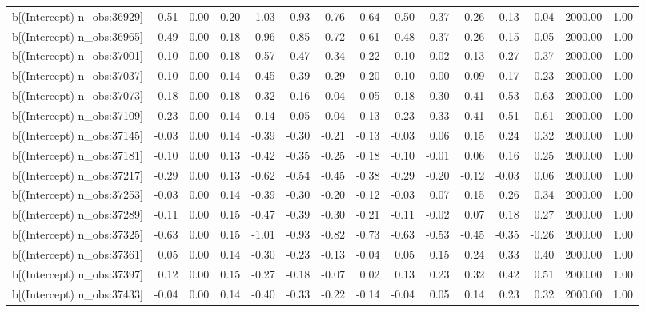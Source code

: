 \begin{table}[ht]
\begin{tabular}{rrrrrrrrrrrrrrr}
  b[(Intercept) n\_obs:36929] & -0.51 & 0.00 & 0.20 & -1.03 & -0.93 & -0.76 & -0.64 & -0.50 & -0.37 & -0.26 & -0.13 & -0.04 & 2000.00 & 1.00 \\ 
  b[(Intercept) n\_obs:36965] & -0.49 & 0.00 & 0.18 & -0.96 & -0.85 & -0.72 & -0.61 & -0.48 & -0.37 & -0.26 & -0.15 & -0.05 & 2000.00 & 1.00 \\ 
  b[(Intercept) n\_obs:37001] & -0.10 & 0.00 & 0.18 & -0.57 & -0.47 & -0.34 & -0.22 & -0.10 & 0.02 & 0.13 & 0.27 & 0.37 & 2000.00 & 1.00 \\ 
  b[(Intercept) n\_obs:37037] & -0.10 & 0.00 & 0.14 & -0.45 & -0.39 & -0.29 & -0.20 & -0.10 & -0.00 & 0.09 & 0.17 & 0.23 & 2000.00 & 1.00 \\ 
  b[(Intercept) n\_obs:37073] & 0.18 & 0.00 & 0.18 & -0.32 & -0.16 & -0.04 & 0.05 & 0.18 & 0.30 & 0.41 & 0.53 & 0.63 & 2000.00 & 1.00 \\ 
  b[(Intercept) n\_obs:37109] & 0.23 & 0.00 & 0.14 & -0.14 & -0.05 & 0.04 & 0.13 & 0.23 & 0.33 & 0.41 & 0.51 & 0.61 & 2000.00 & 1.00 \\ 
  b[(Intercept) n\_obs:37145] & -0.03 & 0.00 & 0.14 & -0.39 & -0.30 & -0.21 & -0.13 & -0.03 & 0.06 & 0.15 & 0.24 & 0.32 & 2000.00 & 1.00 \\ 
  b[(Intercept) n\_obs:37181] & -0.10 & 0.00 & 0.13 & -0.42 & -0.35 & -0.25 & -0.18 & -0.10 & -0.01 & 0.06 & 0.16 & 0.25 & 2000.00 & 1.00 \\ 
  b[(Intercept) n\_obs:37217] & -0.29 & 0.00 & 0.13 & -0.62 & -0.54 & -0.45 & -0.38 & -0.29 & -0.20 & -0.12 & -0.03 & 0.06 & 2000.00 & 1.00 \\ 
  b[(Intercept) n\_obs:37253] & -0.03 & 0.00 & 0.14 & -0.39 & -0.30 & -0.20 & -0.12 & -0.03 & 0.07 & 0.15 & 0.26 & 0.34 & 2000.00 & 1.00 \\ 
  b[(Intercept) n\_obs:37289] & -0.11 & 0.00 & 0.15 & -0.47 & -0.39 & -0.30 & -0.21 & -0.11 & -0.02 & 0.07 & 0.18 & 0.27 & 2000.00 & 1.00 \\ 
  b[(Intercept) n\_obs:37325] & -0.63 & 0.00 & 0.15 & -1.01 & -0.93 & -0.82 & -0.73 & -0.63 & -0.53 & -0.45 & -0.35 & -0.26 & 2000.00 & 1.00 \\ 
  b[(Intercept) n\_obs:37361] & 0.05 & 0.00 & 0.14 & -0.30 & -0.23 & -0.13 & -0.04 & 0.05 & 0.15 & 0.24 & 0.33 & 0.40 & 2000.00 & 1.00 \\ 
  b[(Intercept) n\_obs:37397] & 0.12 & 0.00 & 0.15 & -0.27 & -0.18 & -0.07 & 0.02 & 0.13 & 0.23 & 0.32 & 0.42 & 0.51 & 2000.00 & 1.00 \\ 
  b[(Intercept) n\_obs:37433] & -0.04 & 0.00 & 0.14 & -0.40 & -0.33 & -0.22 & -0.14 & -0.04 & 0.05 & 0.14 & 0.23 & 0.32 & 2000.00 & 1.00 \\ 

\end{tabular}
\end{table}

